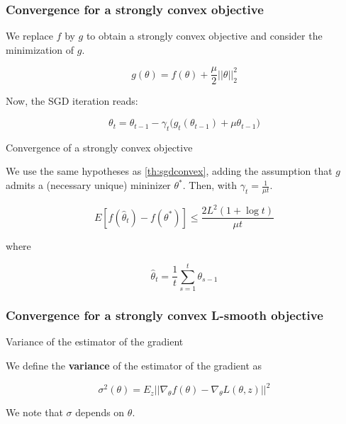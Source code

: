 \documentclass[
10pt, %
a4paper, %
oneside, %
headinclude,footinclude, %
BCOR5mm, %
]{scrartcl}
\begin{document}
\subsubsection{\large\color{Periwinkle}Convergence for a strongly convex objective}

We replace $f$ by $g$ to obtain a strongly convex objective and consider the minimization of $g$.

\begin{equation*}
    g(\theta) = f(\theta)+ \frac{\mu}{2} ||\theta||_2^2
\end{equation*}

Now, the SGD iteration reads:

\begin{equation*}
    \theta_t = \theta_{t-1}- \gamma_t\big(g_t(\theta_{t-1})+\mu \theta_{t-1}\big)
\end{equation*}

\begin{theorem}{Convergence of a strongly convex objective}

    We use the same hypotheses as \ref{th:sgdconvex}, adding the assumption that $g$ admits a (necessary unique) mininizer $\theta^*$. Then, with $\gamma_t =  \frac{1}{\mu t} $.

    \begin{equation*}
	E[f( \hat{\theta}_t)-f(\theta^*)]\leq \frac{2L^2 (1+\log t)}{\mu t} 
    \end{equation*}

    where 

    \begin{equation*}
	\hat{\theta}_t = \frac{1}{t} \sum^{t}_{s=1} \theta_{s-1}
    \end{equation*}

\end{theorem}

\subsubsection{\large\color{Periwinkle}Convergence for a strongly convex L-smooth objective}

\begin{definition}{Variance of the estimator of the gradient}

    We define the \textbf{{variance}} of the estimator of the gradient as

    \begin{equation*}
	\sigma^2(\theta) = E_{z}|| \nabla_{\theta} f(\theta)- \nabla_{\theta}L(\theta, z)||^2
    \end{equation*}

    We note that $\sigma $ depends on $ \theta$.
    
\end{definition}
\end{document}
